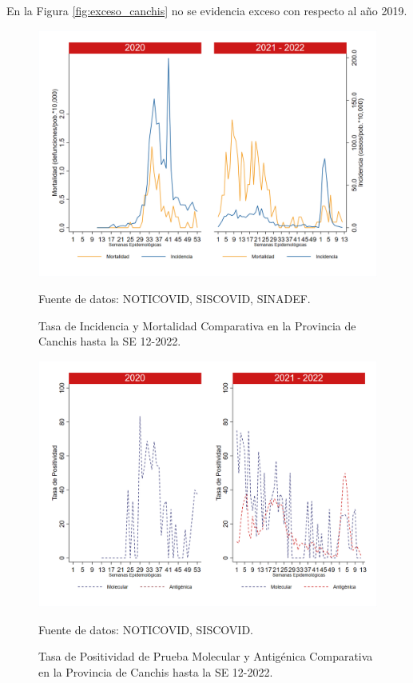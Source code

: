 \documentclass[12pt,a4paper,openany]{book}
\begin{document}
		En la Figura \ref{fig:exceso_canchis} no se evidencia exceso con respecto al año 2019.
		
		\begin{figure}[h]
			\caption{Tasa de Incidencia y Mortalidad Comparativa en la Provincia de Canchis hasta la SE 12-2022.}\label{fig:inc_mort_canchis}
			\begin{center}
				\includegraphics[width=0.85\linewidth]{../figuras/incidencia_mortalidad_20_21_5.png}
			\end{center}
			{\footnotesize {Fuente de datos: NOTICOVID, SISCOVID, SINADEF.}}
		\end{figure}
		
		\begin{figure}[h]
			\caption{Tasa de Positividad de Prueba Molecular y Antigénica Comparativa en la Provincia de Canchis hasta la SE 12-2022.}\label{fig:positividad_canchis}
			\begin{center}
				\includegraphics[width=0.7\linewidth]{../figuras/positividad_20_21_5.png}
			\end{center}
			{\footnotesize {Fuente de datos: NOTICOVID, SISCOVID.}}
		\end{figure}
		
\end{document}
